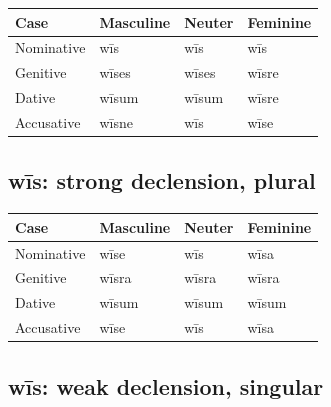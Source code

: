 \par\begingroup
\fontsize{10.5}{13.2}\selectfont
\setlength{\LTleft}{0pt}\setlength{\LTright}{\fill}
\noindent
\begin{tabular}{@{}>{\raggedright\arraybackslash}p{28.89mm}>{\raggedright\arraybackslash}p{28.89mm}>{\raggedright\arraybackslash}p{28.89mm}>{\raggedright\arraybackslash}p{28.89mm}@{}}
\toprule
\textbf{Case} & \textbf{Masculine} & \textbf{Neuter} & \textbf{Feminine} \\
\midrule
Nominative & wīs & wīs & wīs \\
Genitive & wīses & wīses & wīsre \\
Dative & wīsum & wīsum & wīsre \\
Accusative & wīsne & wīs & wīse \\
\bottomrule
\end{tabular}
\par\endgroup

\subsection*{wīs: strong declension, plural}

\par\begingroup
\fontsize{10.5}{13.2}\selectfont
\setlength{\LTleft}{0pt}\setlength{\LTright}{\fill}
\noindent
\begin{tabular}{@{}>{\raggedright\arraybackslash}p{28.89mm}>{\raggedright\arraybackslash}p{28.89mm}>{\raggedright\arraybackslash}p{28.89mm}>{\raggedright\arraybackslash}p{28.89mm}@{}}
\toprule
\textbf{Case} & \textbf{Masculine} & \textbf{Neuter} & \textbf{Feminine} \\
\midrule
Nominative & wīse & wīs & wīsa \\
Genitive & wīsra & wīsra & wīsra \\
Dative & wīsum & wīsum & wīsum \\
Accusative & wīse & wīs & wīsa \\
\bottomrule
\end{tabular}
\par\endgroup

\subsection*{wīs: weak declension, singular}


